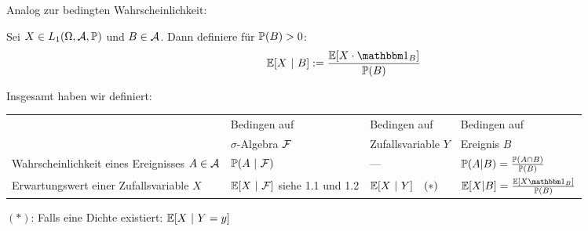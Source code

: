 Analog zur bedingten Wahrscheinlichkeit:
\begin{defi}\enter %
Sei $X\in L_1(\Omega,\A,\P)$ und $B\in\A$. Dann definiere für $\P(B)>0$:
\begin{align*}
\E[X~|~B]:=\frac{\E[X\cdot\indi_B]}{\P(B)}
\end{align*}
\end{defi}

Insgesamt haben wir definiert:\\
\begin{tabular}{m{3cm}|m{3cm}|m{3cm}|m{3cm}}
&Bedingen auf &Bedingen auf & Bedingen auf\\
&$\sigma$-Algebra $\F$ & Zufallsvariable $Y$ & Ereignis $B$\\ \hline
	Wahrscheinlichkeit eines Ereignisses $A\in\A$ & $\P(A~|~\F)$ & --- & $\P(A|B)=\frac{\P(A\cap B)}{\P(B)}$ \\\hline
	Erwartungswert einer Zufallsvariable $X$ & $\E[X~|~\F]$ siehe 1.1 und 1.2 & $\E[X~|~Y]~~~(\ast)$ & $\E[X|B]=\frac{\E[X\indi_B]}{\P(B)}$
\end{tabular}\nl
$(\ast)$: Falls eine Dichte existiert: $\E[X~|~Y=y]$


